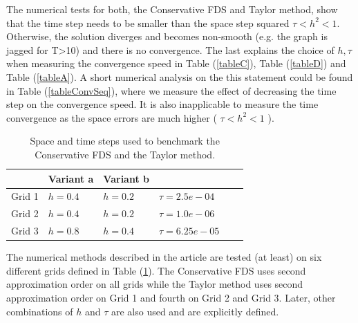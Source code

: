 \documentclass[%
 aip,
cp,  
 amsmath,amssymb,
 reprint,
]{iopconfser}
\newcommand{\rf}[1]{(\ref{#1})}
\begin{document}
The numerical tests for both, the Conservative FDS and Taylor method, show that the time step needs to be smaller than the space step squared $\tau < h^2 < 1$. Otherwise, the solution diverges and becomes non-smooth (e.g. the graph is jagged for T>10) and there is no convergence. The last explains the choice of $h, \tau$ when measuring the convergence speed in Table \rf{tableC}, Table \rf{tableD} and Table \rf{tableA}. A short numerical analysis on the this statement could be found in Table \rf{tableConvSeq}, where we measure the effect of decreasing the time step on the convergence speed. It is also inapplicable to measure the time convergence as the space errors are much higher ( $\tau < h^2 < 1$ ).

\begin{table}[ht]
\centering
\small
		\begin{tabular}{|c|l|l|l|l|l|}
			\hline
                               &           Variant a  &           Variant b     &     \\
			\hline
            Grid 1          &            $h=0.4$  &            $h=0.2$     &    $\tau = 2.5e-04$  \\
			\hline
           Grid 2         &            $h=0.4$  &   $h=0.2$  &    $\tau =1.0e-06$   \\   
   			\hline 
           Grid 3         &            $h=0.8$  &            $h=0.4$  &    $\tau =6.25e-05$   \\    
	   \hline
		\end{tabular}
	\caption{ Space and time steps used to benchmark the Conservative FDS and the Taylor method.}
	\label{gridsT}
\end{table}

The numerical methods described in the article are tested (at least) on six different grids defined in Table \rf{gridsT}. The Conservative FDS uses second approximation order on all grids while the Taylor method uses second approximation order on Grid 1 and fourth on Grid 2 and Grid 3. Later, other combinations of $h$ and $\tau$ are also used and are explicitly defined.
\end{document}
